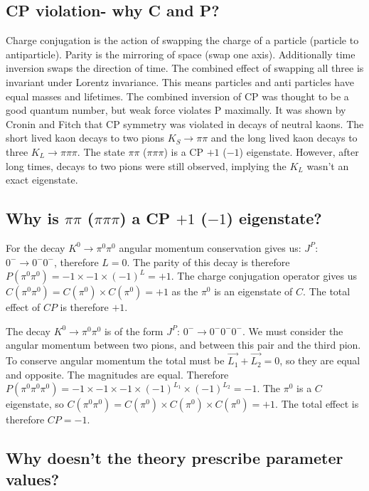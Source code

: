 \documentclass[12pt]{article}
\begin{document}
\subsection{CP violation- why C and P?}
Charge conjugation is the action of swapping the charge of a particle (particle to antiparticle). Parity is the mirroring of space (swap one axis). Additionally time inversion swaps the direction of time. The combined effect of swapping all three is invariant under Lorentz invariance. This means particles and anti particles have equal masses and lifetimes. The combined inversion of CP was thought to be a good quantum number, but weak force violates P maximally. It was shown by Cronin and Fitch that CP symmetry was violated in decays of neutral kaons. The short lived kaon decays to two pions $K_{S} \rightarrow \pi \pi$ and the long lived kaon decays to three $K_{L} \rightarrow \pi\pi\pi$. The state $\pi\pi$ ($\pi\pi\pi$) is a CP $+1$ ($-1$) eigenstate. However, after long times, decays to two pions were still observed, implying the $K_{L}$ wasn't an exact eigenstate. 

\subsection{Why is $\pi\pi$ ($\pi\pi\pi$) a CP $+1$ ($-1$) eigenstate?}

For the decay $K^{0} \rightarrow \pi^{0} \pi^{0}$ angular momentum conservation gives us:
$J^{P}$: $0^{-}\rightarrow0^{-}0^{-}$, therefore $L = 0$. The parity of this decay is therefore $P(\pi^{0}\pi^{0}) = -1 \times -1 \times (-1)^{L} = +1$. The charge conjugation operator gives us $C(\pi^{0}\pi^{0}) = C(\pi^{0}) \times C(\pi^{0}) = +1$ as the $\pi^{0}$ is an eigenstate of $C$. 
The total effect of $CP$ is therefore $+1$.


The decay $K^{0} \rightarrow \pi^{0} \pi^{0}$ is of the form $J^{P}$: $0^{-}\rightarrow0^{-}0^{-}0^{-}$. We must consider the angular momentum between two pions, and between this pair and the third pion. To conserve angular momentum the total must be $\vec{L_{1}} + \vec{L_{2}} = 0$, so they are equal and opposite. The magnitudes are equal. 
Therefore $P(\pi^{0}\pi^{0}\pi^{0}) = -1 \times -1 \times -1 \times (-1)^{L_{1}} \times (-1)^{L_{2}} = -1$. 
The $\pi^{0}$ is a $C$ eigenstate, so $C(\pi^{0}\pi^{0}) = C(\pi^{0}) \times C(\pi^{0}) \times C(\pi^{0}) = +1$.
The total effect is therefore $CP = -1$.


 
\subsection{Why doesn't the theory prescribe parameter values?}
\end{document}
